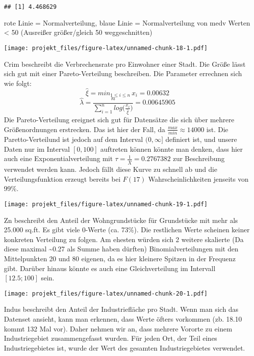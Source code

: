 \documentclass[]{article}
\newenvironment{Shaded}{\begin{snugshade}}{\end{snugshade}}
\newcommand{\KeywordTok}[1]{\textcolor[rgb]{0.13,0.29,0.53}{\textbf{#1}}}
\newcommand{\OperatorTok}[1]{\textcolor[rgb]{0.81,0.36,0.00}{\textbf{#1}}}
\newcommand{\NormalTok}[1]{#1}
\begin{document}
\begin{Shaded}
\end{Shaded}

\begin{verbatim}
## [1] 4.468629
\end{verbatim}

rote Linie = Normalverteilung, blaue Linie = Normalverteilung von medv
Werten \textless{} 50 (Ausreißer größer/gleich 50 weggeschnitten)

\texttt{[image: projekt\_files/figure-latex/unnamed-chunk-18-1.pdf]}

Crim beschreibt die Verbrechensrate pro Einwohner einer Stadt. Die Größe
lässt sich gut mit einer Pareto-Verteilung beschreiben. Die Parameter
errechnen sich wie folgt:
\[ \hat \xi = min_{1 \leq i \leq n} \, x_i = 0.00632\]
\[ \hat \lambda = \frac{n}{\sum_{i=1}^n log \Big ( \frac{x_i}{\hat \xi}\Big)} =  0.00645905 \]
Die Pareto-Verteilung ereignet sich gut für Datensätze die sich über
mehrere Größenordnungen erstrecken. Das ist hier der Fall, da
\(\frac{max}{min} \approx 14000\) ist. Die Paretto-Verteilund ist jedoch
auf dem Interval \((0, \infty]\) definiert ist, und unsere Daten nur im
Interval \([0, 100]\) auftreten können könnte man denken, dass hier auch
eine Exponentialverteilung mit
\(\tau = \frac{1}{\overline X} = 0.2767382\) zur Beschreibung verwendet
werden kann. Jedoch fällt diese Kurve zu schnell ab und die
Verteilungsfunktion erzeugt bereits bei \(F(17)\) Wahrscheinlichkeiten
jenseits von 99\%.

\texttt{[image: projekt\_files/figure-latex/unnamed-chunk-19-1.pdf]}

Zn beschreibt den Anteil der Wohngrundstücke für Grundstücke mit mehr
als 25.000 sq.ft. Es gibt viele 0-Werte (ca. 73\%). Die restlichen Werte
scheinen keiner konkreten Verteilung zu folgen. Am ehesten würden sich 2
weitere skalierte (Da diese maximal \textasciitilde{}0.27 als Summe
haben dürften) Binomialverteilungen mit den Mittelpunkten 20 und 80
eigenen, da es hier kleinere Spitzen in der Frequenz gibt. Darüber
hinaus könnte es auch eine Gleichverteilung im Intervall \([12.5; 100]\)
sein.

\texttt{[image: projekt\_files/figure-latex/unnamed-chunk-20-1.pdf]}

Indus beschreibt den Anteil der Industriefläche pro Stadt. Wenn man sich
das Datenset ansieht, kann man erkennen, dass Werte öfters vorkommen
(zb. 18.10 kommt 132 Mal vor). Daher nehmen wir an, dass mehrere Vororte
zu einem Industriegebiet zusammengefasst wurden. Für jeden Ort, der Teil
eines Industriegebietes ist, wurde der Wert des gesamten
Industriegebietes verwendet.
\end{document}
